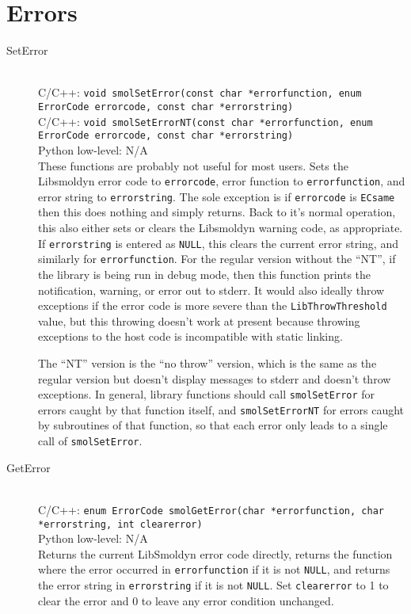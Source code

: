 \documentclass {book}
\newcommand {\ttt} {\texttt}
\begin{document}
\section{Errors}

\begin{description}

\item[SetError]
\hfill \\
C/C++: \ttt{void smolSetError(const char *errorfunction, enum ErrorCode errorcode, const char *errorstring)}\\
C/C++: \ttt{void smolSetErrorNT(const char *errorfunction, enum ErrorCode errorcode, const char *errorstring)}\\
Python low-level: N/A\\
These functions are probably not useful for most users. Sets the Libsmoldyn error code to \ttt{errorcode}, error function to \ttt{errorfunction}, and error string to \ttt{errorstring}. The sole exception is if \ttt{errorcode} is \ttt{ECsame} then this does nothing and simply returns. Back to it's normal operation, this also either sets or clears the Libsmoldyn warning code, as appropriate. If \ttt{errorstring} is entered as \ttt{NULL}, this clears the current error string, and similarly for \ttt{errorfunction}. For the regular version without the ``NT'', if the library is being run in debug mode, then this function prints the notification, warning, or error out to stderr. It would also ideally throw exceptions if the error code is more severe than the \ttt{LibThrowThreshold} value, but this throwing doesn't work at present because throwing exceptions to the host code is incompatible with static linking.

The ``NT'' version is the ``no throw'' version, which is the same as the regular version but doesn't display messages to stderr and doesn't throw exceptions. In general, library functions should call \ttt{smolSetError} for errors caught by that function itself, and \ttt{smolSetErrorNT} for errors caught by subroutines of that function, so that each error only leads to a single call of \ttt{smolSetError}.

\item[GetError]
\hfill \\
C/C++: \ttt{enum ErrorCode smolGetError(char *errorfunction, char *errorstring, int clearerror)}\\
Python low-level: N/A\\
Returns the current LibSmoldyn error code directly, returns the function where the error occurred in \ttt{errorfunction} if it is not \ttt{NULL}, and returns the error string in \ttt{errorstring} if it is not \ttt{NULL}. Set \ttt{clearerror} to 1 to clear the error and 0 to leave any error condition unchanged.


\end{description}
\end{document}
